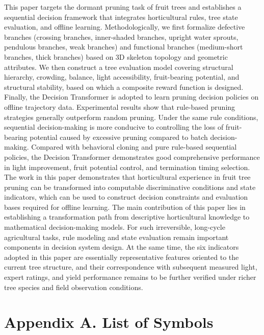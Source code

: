 \documentclass[12pt,a4paper,fontset=fandol]{ctexart}
\begin{document}
This paper targets the dormant pruning task of fruit trees and establishes a sequential decision framework that integrates horticultural rules, tree state evaluation, and offline learning. Methodologically, we first formalize defective branches (crossing branches, inner-shaded branches, upright water sprouts, pendulous branches, weak branches) and functional branches (medium-short branches, thick branches) based on 3D skeleton topology and geometric attributes. We then construct a tree evaluation model covering structural hierarchy, crowding, balance, light accessibility, fruit-bearing potential, and structural stability, based on which a composite reward function is designed. Finally, the Decision Transformer is adopted to learn pruning decision policies on offline trajectory data.
Experimental results show that rule-based pruning strategies generally outperform random pruning. Under the same rule conditions, sequential decision-making is more conducive to controlling the loss of fruit-bearing potential caused by excessive pruning compared to batch decision-making. Compared with behavioral cloning and pure rule-based sequential policies, the Decision Transformer demonstrates good comprehensive performance in light improvement, fruit potential control, and termination timing selection.
The work in this paper demonstrates that horticultural experience in fruit tree pruning can be transformed into computable discriminative conditions and state indicators, which can be used to construct decision constraints and evaluation bases required for offline learning. The main contribution of this paper lies in establishing a transformation path from descriptive horticultural knowledge to mathematical decision-making models. For such irreversible, long-cycle agricultural tasks, rule modeling and state evaluation remain important components in decision system design. At the same time, the six indicators adopted in this paper are essentially representative features oriented to the current tree structure, and their correspondence with subsequent measured light, expert ratings, and yield performance remains to be further verified under richer tree species and field observation conditions.


\appendix
\section*{Appendix A. List of Symbols}
{}
\label{app:symbols}
\end{document}
